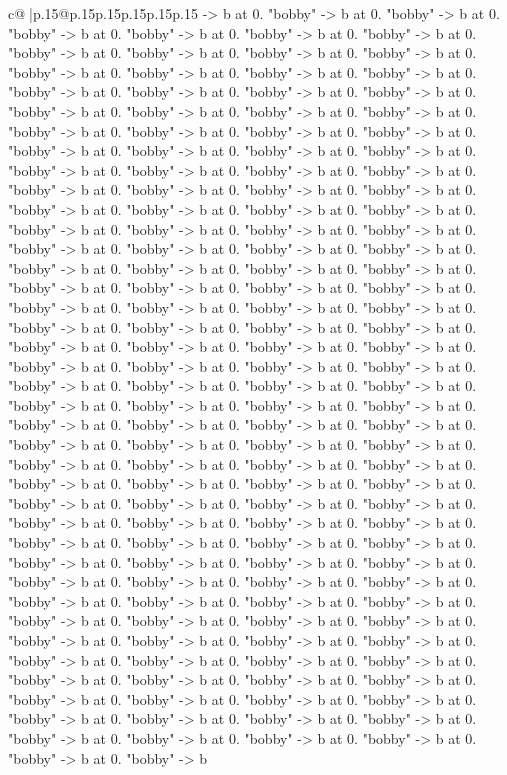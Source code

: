 \documentclass{article}
\begin{document}
{\begin{supertabular}{c@{$\;$}|p{.15\linewidth}@{}p{.15\linewidth}p{.15\linewidth}p{.15\linewidth}p{.15\linewidth}p{.15\linewidth}}
{{{{-}> b at 0. "bobby" {-}> b at 0. "bobby" {-}> b at 0. "bobby" {-}> b at 0. "bobby" {-}> b at 0. "bobby" {-}> b at 0. "bobby" {-}> b at 0. "bobby" {-}> b at 0. "bobby" {-}> b at 0. "bobby" {-}> b at 0. "bobby" {-}> b at 0. "bobby" {-}> b at 0. "bobby" {-}> b at 0. "bobby" {-}> b at 0. "bobby" {-}> b at 0. "bobby" {-}> b at 0. "bobby" {-}> b at 0. "bobby" {-}> b at 0. "bobby" {-}> b at 0. "bobby" {-}> b at 0. "bobby" {-}> b at 0. "bobby" {-}> b at 0. "bobby" {-}> b at 0. "bobby" {-}> b at 0. "bobby" {-}> b at 0. "bobby" {-}> b at 0. "bobby" {-}> b at 0. "bobby" {-}> b at 0. "bobby" {-}> b at 0. "bobby" {-}> b at 0. "bobby" {-}> b at 0. "bobby" {-}> b at 0. "bobby" {-}> b at 0. "bobby" {-}> b at 0. "bobby" {-}> b at 0. "bobby" {-}> b at 0. "bobby" {-}> b at 0. "bobby" {-}> b at 0. "bobby" {-}> b at 0. "bobby" {-}> b at 0. "bobby" {-}> b at 0. "bobby" {-}> b at 0. "bobby" {-}> b at 0. "bobby" {-}> b at 0. "bobby" {-}> b at 0. "bobby" {-}> b at 0. "bobby" {-}> b at 0. "bobby" {-}> b at 0. "bobby" {-}> b at 0. "bobby" {-}> b at 0. "bobby" {-}> b at 0. "bobby" {-}> b at 0. "bobby" {-}> b at 0. "bobby" {-}> b at 0. "bobby" {-}> b at 0. "bobby" {-}> b at 0. "bobby" {-}> b at 0. "bobby" {-}> b at 0. "bobby" {-}> b at 0. "bobby" {-}> b at 0. "bobby" {-}> b at 0. "bobby" {-}> b at 0. "bobby" {-}> b at 0. "bobby" {-}> b at 0. "bobby" {-}> b at 0. "bobby" {-}> b at 0. "bobby" {-}> b at 0. "bobby" {-}> b at 0. "bobby" {-}> b at 0. "bobby" {-}> b at 0. "bobby" {-}> b at 0. "bobby" {-}> b at 0. "bobby" {-}> b at 0. "bobby" {-}> b at 0. "bobby" {-}> b at 0. "bobby" {-}> b at 0. "bobby" {-}> b at 0. "bobby" {-}> b at 0. "bobby" {-}> b at 0. "bobby" {-}> b at 0. "bobby" {-}> b at 0. "bobby" {-}> b at 0. "bobby" {-}> b at 0. "bobby" {-}> b at 0. "bobby" {-}> b at 0. "bobby" {-}> b at 0. "bobby" {-}> b at 0. "bobby" {-}> b at 0. "bobby" {-}> b at 0. "bobby" {-}> b at 0. "bobby" {-}> b at 0. "bobby" {-}> b at 0. "bobby" {-}> b at 0. "bobby" {-}> b at 0. "bobby" {-}> b at 0. "bobby" {-}> b at 0. "bobby" {-}> b at 0. "bobby" {-}> b at 0. "bobby" {-}> b at 0. "bobby" {-}> b at 0. "bobby" {-}> b at 0. "bobby" {-}> b at 0. "bobby" {-}> b at 0. "bobby" {-}> b at 0. "bobby" {-}> b at 0. "bobby" {-}> b at 0. "bobby" {-}> b at 0. "bobby" {-}> b at 0. "bobby" {-}> b at 0. "bobby" {-}> b at 0. "bobby" {-}> b at 0. "bobby" {-}> b at 0. "bobby" {-}> b at 0. "bobby" {-}> b at 0. "bobby" {-}> b at 0. "bobby" {-}> b at 0. "bobby" {-}> b at 0. "bobby" {-}> b at 0. "bobby" {-}> b at 0. "bobby" {-}> b at 0. "bobby" {-}> b at 0. "bobby" {-}> b at 0. "bobby" {-}> b at 0. "bobby" {-}> b at 0. "bobby" {-}> b at 0. "bobby" {-}> b at 0. "bobby" {-}> b at 0. "bobby" {-}> b at 0. "bobby" {-}> b at 0. "bobby" {-}> b at 0. "bobby" {-}> b at 0. "bobby" {-}> b at 0. "bobby" {-}> b at 0. "bobby" {-}> b at 0. "bobby" {-}> b at 0. "bobby" {-}> b at 0. "bobby" {-}> b at 0. "bobby" {-}> b at 0. "bobby" {-}> b at 0. "bobby" {-}> b at 0. "bobby" {-}> b at 0. "bobby" {-}> b at 0. "bobby" {-}> b at 0. "bobby" {-}> b at 0. "bobby" {-}> b at 0. "bobby" {-}> b at 0. "bobby" {-}> b at 0. "bobby" {-}> b at 0. "bobby" {-}> b at 0. "bobby" {-}> b at 0. "bobby" {-}> b at 0. "bobby" {-}> b at 0. "bobby" {-}> b }}}
\end{supertabular}}
\end{document}
